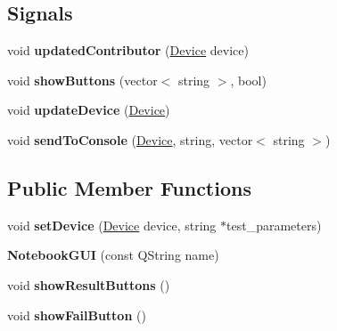 \subsection*{Signals}
\begin{DoxyCompactItemize}
\item 
\mbox{\label{classNotebookGUI_abef5dbd76aefa47c910aeead0ad93023}} 
void {\bfseries updated\+Contributor} (\hyperlink{classDevice}{Device} device)
\item 
\mbox{\label{classNotebookGUI_af35799599bf211bb41938c1bd3c5b3c3}} 
void {\bfseries show\+Buttons} (vector$<$ string $>$, bool)
\item 
\mbox{\label{classNotebookGUI_a03364e41a531b82671c130adb63f8fc7}} 
void {\bfseries update\+Device} (\hyperlink{classDevice}{Device})
\item 
\mbox{\label{classNotebookGUI_a4c798f9054beb2954af7d64eda562504}} 
void {\bfseries send\+To\+Console} (\hyperlink{classDevice}{Device}, string, vector$<$ string $>$)
\end{DoxyCompactItemize}
\subsection*{Public Member Functions}
\begin{DoxyCompactItemize}
\item 
\mbox{\label{classNotebookGUI_a87df8290721912a46164f7c34ad4df42}} 
void {\bfseries set\+Device} (\hyperlink{classDevice}{Device} device, string $\ast$test\+\_\+parameters)
\item 
\mbox{\label{classNotebookGUI_a53202e15038548e1bc83bad3cfb6397b}} 
{\bfseries Notebook\+G\+UI} (const Q\+String name)
\item 
\mbox{\label{classNotebookGUI_a44dc0f2eb98b47a447c2088216512f2e}} 
void {\bfseries show\+Result\+Buttons} ()
\item 
\mbox{\label{classNotebookGUI_a189f72dabffb1e71e02a1705288f021f}} 
void {\bfseries show\+Fail\+Button} ()
\end{DoxyCompactItemize}
